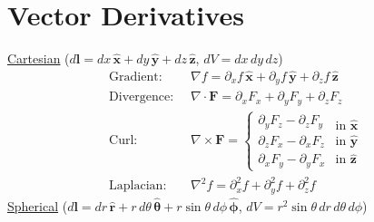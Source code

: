\section{Vector Derivatives}
\underline{Cartesian} ($d\mathbf{l} = dx\,\hat{\mathbf{x}} + dy\,\hat{\mathbf{y}} + dz\,\hat{\mathbf{z}}$, $dV = dx\,dy\,dz$)
\begin{align*}
\text{Gradient:}   \;\; &\nabla f = \partial_x f\,\hat{\mathbf{x}} 
                                 + \partial_y f\,\hat{\mathbf{y}} 
                                 + \partial_z f\,\hat{\mathbf{z}} \\
\text{Divergence:} \;\; &\nabla \cdot \mathbf{F} = \partial_x F_x 
                                 + \partial_y F_y 
                                 + \partial_z F_z \\
\text{Curl:}       \;\; &\nabla \times \mathbf{F} = \begin{cases}
                                  \partial_y F_z - \partial_z F_y \\[2pt]
                                  \partial_z F_x - \partial_x F_z \\[2pt]
                                  \partial_x F_y - \partial_y F_x
                                  \end{cases} 
                                  \begin{matrix}
                                  \text{in } \hat{\mathbf{x}} \\[2pt]
                                  \text{in } \hat{\mathbf{y}} \\[2pt]
                                  \text{in } \hat{\mathbf{z}}
                                  \end{matrix} \\
\text{Laplacian:}  \;\; &\nabla^2 f = \partial^2_x f + \partial^2_y f + \partial^2_z f
\end{align*}
\underline{Spherical} ($d\mathbf{l} = dr\,\hat{\mathbf{r}} + r\,d\theta\,\bm{\hat{\theta}} + r\sin\theta\,d\phi\,\bm{\hat{\phi}}$, $dV = r^2\sin\theta\,dr\,d\theta\,d\phi$)
